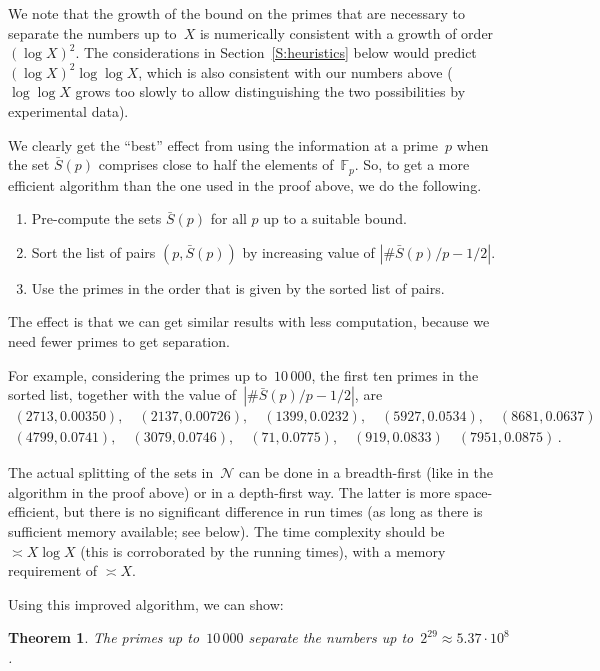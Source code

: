\documentclass[12pt,a4paper]{amsart}
\newcommand{\F}{{\mathbb F}}
\newcommand{\CN}{{\mathcal N}}
\newtheorem{Theorem}{Theorem}[section]
\theoremstyle{definition}
\numberwithin{equation}{section}
\begin{document}
We note that the growth of the bound on the primes that are necessary to
separate the numbers up to~$X$ is numerically consistent with a growth of
order $(\log X)^2$. The considerations in Section~\ref{S:heuristics} below would
predict $(\log X)^2 \log \log X$, which is also consistent with our numbers above
($\log \log X$ grows too slowly to allow distinguishing the two possibilities
by experimental data).

We clearly get the ``best'' effect from using the information at a prime~$p$
when the set $\bar{S}(p)$ comprises close to half the elements of~$\F_p$.
So, to get a more efficient algorithm than the one used in the proof above,
we do the following.
\begin{enumerate}[1.]
  \item Pre-compute the sets $\bar{S}(p)$ for all $p$ up to a suitable bound.
  \item Sort the list of pairs $(p, \bar{S}(p))$ by increasing value of
        $|\#\bar{S}(p)/p - 1/2|$.
  \item Use the primes in the order that is given by the sorted list of pairs.
\end{enumerate}

The effect is that we can get similar results with less computation, because
we need fewer primes to get separation.

For example, considering the primes up to~$10\,000$, the first ten primes in the
sorted list, together with the value of~$|\#\bar{S}(p)/p - 1/2|$, are
\begin{gather*}
  (2713, 0.00350), \quad (2137, 0.00726), \quad (1399, 0.0232), \quad
  (5927, 0.0534), \quad (8681, 0.0637) \\
  (4799, 0.0741), \quad (3079, 0.0746), \quad (71, 0.0775), \quad
  (919, 0.0833) \quad (7951, 0.0875) \,.
\end{gather*}

The actual splitting of the sets in~$\CN$ can be done in a breadth-first (like in
the algorithm in the proof above) or in a depth-first way. The latter is
more space-efficient, but there is no significant difference in run times
(as long as there is sufficient memory available; see below). The time
complexity should be $\asymp X \log X$ (this is corroborated by the running times),
with a memory requirement of $\asymp X$.

Using this improved algorithm, we can show:

\begin{Theorem} \label{T:2_29}
  The primes up to~$10\,000$ separate the numbers up to~$2^{29} \approx 5.37 \cdot 10^8$.
\end{Theorem}
\end{document}
